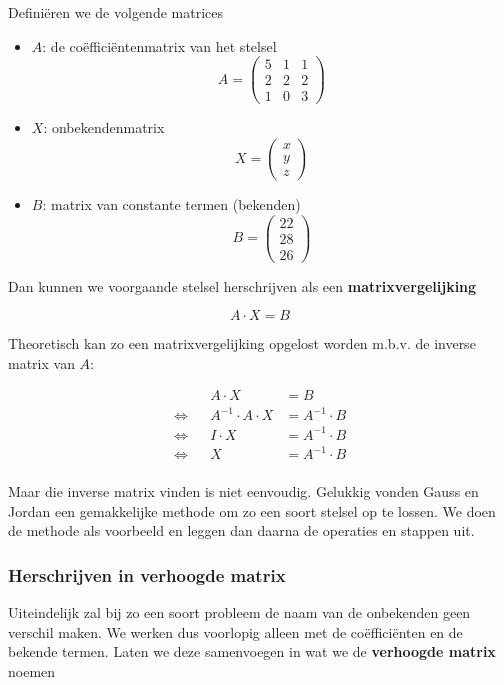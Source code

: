\documentclass[12pt,twoside]{article}
\begin{document}
Definiëren we de volgende matrices
\begin{itemize}
\item $A$: de coëfficiëntenmatrix van het stelsel
  $$A = \begin{pmatrix}5 & 1 & 1\\ 2 & 2 & 2 \\ 1 & 0 & 3\end{pmatrix}$$
\item $X$: onbekendenmatrix
  $$X = \begin{pmatrix} x \\ y \\ z \end{pmatrix}$$
\item $B$: matrix van constante termen (bekenden)
  $$B = \begin{pmatrix} 22 \\ 28 \\ 26 \end{pmatrix}$$
\end{itemize}

Dan kunnen we voorgaande stelsel herschrijven als een {\bf matrixvergelijking}

$$A \cdot X = B$$

Theoretisch kan zo een matrixvergelijking opgelost worden m.b.v. de inverse matrix van $A$:

\begin{align*}
  &&  A \cdot X &= B\\
  \Leftrightarrow&&  A^{-1} \cdot A \cdot X &= A^{-1} \cdot B\\
  \Leftrightarrow&&  I \cdot X &= A^{-1} \cdot B\\
  \Leftrightarrow&&  X &= A^{-1} \cdot B\\
\end{align*}

Maar die inverse matrix vinden is niet eenvoudig. Gelukkig vonden Gauss en Jordan een gemakkelijke methode om zo een soort stelsel op te lossen. We doen de methode als voorbeeld en leggen dan daarna de operaties en stappen uit.

\subsubsection*{Herschrijven in verhoogde matrix}

Uiteindelijk zal bij zo een soort probleem de naam van de onbekenden geen verschil maken. We werken dus voorlopig alleen met de coëfficiënten en de bekende termen. Laten we deze samenvoegen in wat we de {\bf verhoogde matrix} noemen
\end{document}
